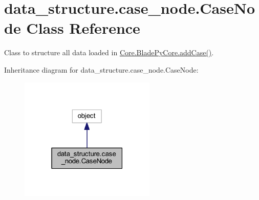 \hypertarget{a00086}{}\section{data\+\_\+structure.\+case\+\_\+node.\+Case\+Node Class Reference}
\label{a00086}


Class to structure all data loaded in \hyperlink{a00078_a1a62f9b5b8f5929bdb6f0a8c27049d9e}{Core.\+Blade\+Py\+Core.\+add\+Case()}.  




Inheritance diagram for data\+\_\+structure.\+case\+\_\+node.\+Case\+Node\+:\nopagebreak
\begin{figure}[H]
\begin{center}
\leavevmode
\includegraphics[width=183pt]{a00085}
\end{center}
\end{figure}
